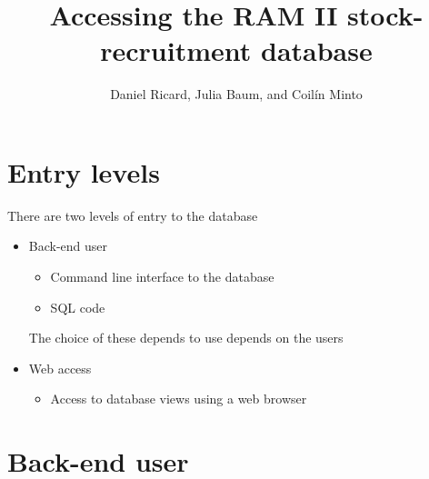 \documentclass[a4paper,10pt,oneside]{book}
\author{Daniel Ricard, Julia Baum, and Coil\'{i}n Minto}
\title{Accessing the RAM II stock-recruitment database}
\begin{document}
\maketitle
\tableofcontents

\chapter{Entry levels}
There are two levels of entry to the database
\begin{itemize}
 \item Back-end user
\begin{itemize}
 \item Command line interface to the database
 \item SQL code
\end{itemize}
The choice of these depends to use depends on the users 
\item Web access
\begin{itemize}
 \item Access to database views using a web browser
\end{itemize}
\end{itemize}

\chapter{Back-end user}
\end{document}
